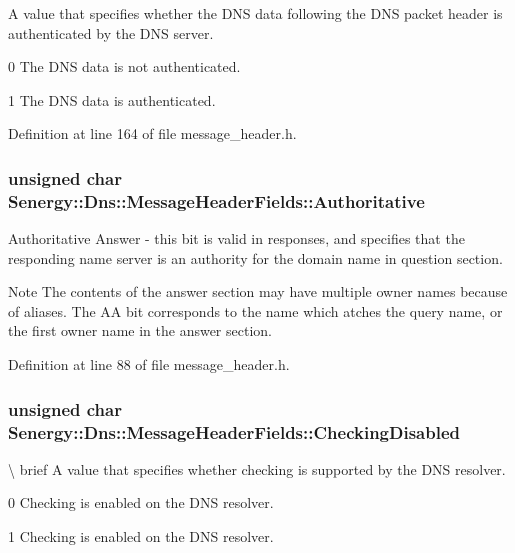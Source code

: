 A value that specifies whether the D\-N\-S data following the D\-N\-S packet header is authenticated by the D\-N\-S server. 

0 The D\-N\-S data is not authenticated.

1 The D\-N\-S data is authenticated. 

Definition at line 164 of file message\-\_\-header.\-h.

\hypertarget{struct_senergy_1_1_dns_1_1_message_header_fields_a706fe34b459a6aaacc28f0249213b013}{
\subsubsection[{Authoritative}]{\setlength{\rightskip}{0pt plus 5cm}unsigned char Senergy\-::\-Dns\-::\-Message\-Header\-Fields\-::\-Authoritative}}\label{struct_senergy_1_1_dns_1_1_message_header_fields_a706fe34b459a6aaacc28f0249213b013}


Authoritative Answer -\/ this bit is valid in responses, and specifies that the responding name server is an authority for the domain name in question section. 

\begin{DoxyNote}{Note}
The contents of the answer section may have multiple owner names because of aliases. The A\-A bit corresponds to the name which atches the query name, or the first owner name in the answer section. 
\end{DoxyNote}


Definition at line 88 of file message\-\_\-header.\-h.

\hypertarget{struct_senergy_1_1_dns_1_1_message_header_fields_a2c846064b4582f46a94bd90b32ef1cd9}{
\subsubsection[{Checking\-Disabled}]{\setlength{\rightskip}{0pt plus 5cm}unsigned char Senergy\-::\-Dns\-::\-Message\-Header\-Fields\-::\-Checking\-Disabled}}\label{struct_senergy_1_1_dns_1_1_message_header_fields_a2c846064b4582f46a94bd90b32ef1cd9}
\textbackslash{} brief A value that specifies whether checking is supported by the D\-N\-S resolver. \begin{DoxyVerb}      0               Checking is enabled on the DNS resolver.

      1               Checking is enabled on the DNS resolver.\end{DoxyVerb}
 

